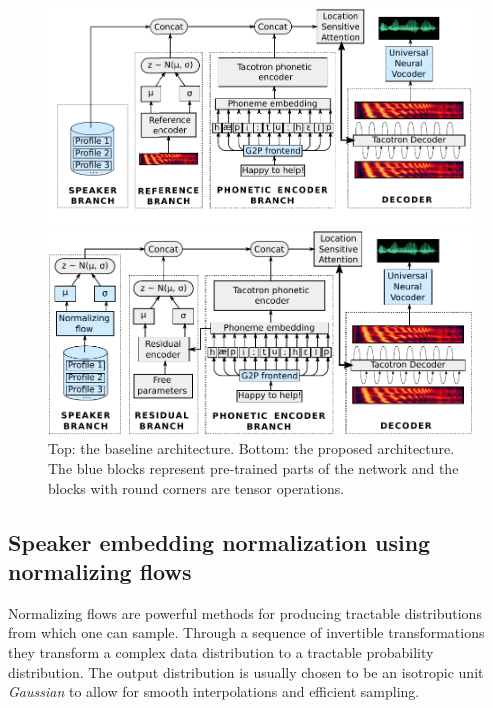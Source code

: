\begin{figure}[h!]
	\centering

	\includegraphics[width=1.0\linewidth]{tts/images/baseline_architecture}

	\vspace{0.5cm}

	\includegraphics[width=1.0\linewidth]{tts/images/proposed_architecture}

	\caption[TTS baseline vs proposed architectures]{Top: the baseline architecture. Bottom: the proposed architecture. The blue blocks represent pre-trained parts of the network and the blocks with round corners are tensor operations.}
	\label{fig:architectures}
\end{figure}


\subsection{Speaker embedding normalization using normalizing flows}
Normalizing flows \autocite{rezende2015} are powerful methods for producing tractable distributions from which one can sample. Through a sequence of invertible transformations they transform a complex data distribution to a tractable probability distribution. The output distribution is usually chosen to be an isotropic unit \textit{Gaussian} to allow for smooth interpolations and efficient sampling.

